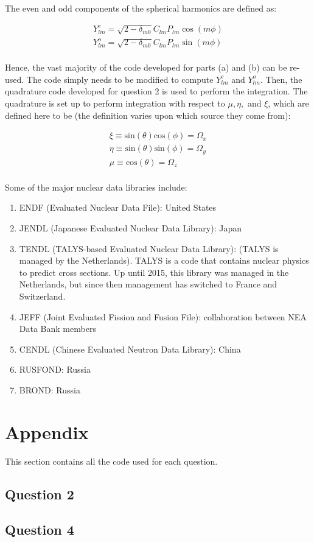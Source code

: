 \documentclass[10pt]{article}
\newcommand*\circled[1]{\tikz[baseline=(char.base)]{
            \node[shape=circle,draw,inner sep=2pt] (char) {#1};}}
\begin{document}
The even and odd components of the spherical harmonics are defined as:

\begin{equation}
\label{eq:RealExpansionSH}
\begin{aligned}
Y_{lm}^e=\sqrt{2-\delta_{m0}}C_{lm}P_{lm}\cos{(m\phi)}\\
Y_{lm}^o=\sqrt{2-\delta_{m0}}C_{lm}P_{lm}\sin{(m\phi)}\\
\end{aligned}
\end{equation}

Hence, the vast majority of the code developed for parts (a) and (b) can be re-used. The code simply needs to be modified to compute \(Y_{lm}^e\) and \(Y_{lm}^o\). Then, the quadrature code developed for question 2 is used to perform the integration. The quadrature is set up to perform integration with respect to \(\mu,\eta,\) and \(\xi\), which are defined here to be (the definition varies upon which source they come from):

\begin{equation}
\label{eq:OmegaComponentsCartesian}
\begin{aligned}
 \xi \equiv \textrm{sin}(\theta)\textrm{cos}(\phi)=\Omega_x\\
 \eta \equiv \textrm{sin}(\theta)\textrm{sin}(\phi)=\Omega_y\\
 \mu \equiv \textrm{cos}(\theta)=\Omega_z\\
\end{aligned}
\end{equation}





\circled{5} Some of the major nuclear data libraries include:

\begin{enumerate}
\item ENDF (Evaluated Nuclear Data File): United States
\item JENDL (Japanese Evaluated Nuclear Data Library): Japan
\item TENDL (TALYS-based Evaluated Nuclear Data Library): (TALYS is managed by the Netherlands). TALYS is a code that contains nuclear physics to predict cross sections. Up until 2015, this library was managed in the Netherlands, but since then management has switched to France and Switzerland.
\item JEFF (Joint Evaluated Fission and Fusion File): collaboration between NEA Data Bank members
\item CENDL (Chinese Evaluated Neutron Data Library): China
\item RUSFOND: Russia
\item BROND: Russia
\end{enumerate}

\section{Appendix}
This section contains all the code used for each question. 

\subsection{Question 2}


\subsection{Question 4}

\end{document}
